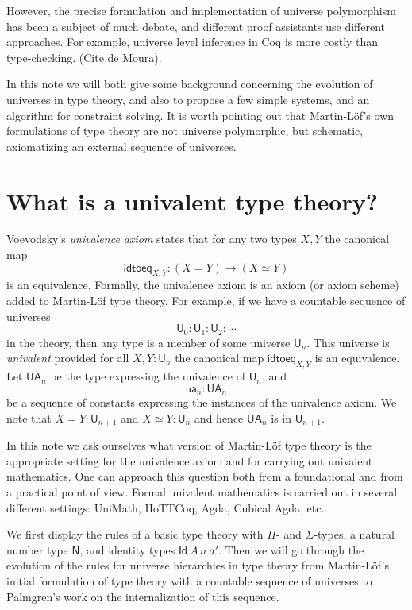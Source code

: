 \documentclass[10pt,a4paper]{article}
\newcommand{\Id}{\mathsf{Id}}
\def\NN{\mathsf{N}}
\def\UU{\mathsf{U}}
\newcommand{\idtoeq}{\mathsf{idtoeq}}
\newcommand{\ua}{\mathsf{ua}}
\newcommand{\UA}{\mathsf{UA}}
\begin{document}
However, the precise formulation and implementation of universe polymorphism has been a subject of much debate, and different proof assistants use different approaches. For example, universe level inference in Coq is more costly than type-checking. (Cite de Moura).

In this note we will both give some background concerning the evolution of universes in type theory, and also to propose a few simple systems, and an algorithm for constraint solving. It is worth pointing out that Martin-Löf's own formulations of type theory are not universe polymorphic, but schematic, axiomatizing an external sequence of universes.

\section{What is a univalent type theory?}

Voevodsky's {\em univalence axiom} states that for any two types $X,Y$ the canonical map 
$$
\idtoeq_{X,Y} : (X=Y)\to (X\simeq Y)
$$
is an equivalence. Formally, the univalence axiom is an axiom (or axiom scheme) added to Martin-Löf type theory. For example, if we have a countable sequence of universes
$$
\UU_0 : \UU_1 : \UU_2 : \cdots
$$
in the theory, then any type is a member of some universe $\UU_n$. This universe is {\em univalent} provided for all $X,Y : \UU_n$ the canonical map $\idtoeq_{X,Y}$ is an equivalence. Let $\UA_n$ be the type expressing the univalence of $\UU_n$, and $$\ua_n : \UA_n$$ be a sequence of constants expressing the instances of the univalence axiom. We note that $X = Y : \UU_{n+1}$ and $X\simeq Y : \UU_n$ and hence $\UA_n$ is in $\UU_{n+1}$. 

In this note we ask ourselves what version of Martin-Löf type theory is the appropriate setting for the univalence axiom and for carrying out univalent mathematics. One can approach this question both from a foundational and from a practical point of view. Formal univalent mathematics is carried out in several different settings: UniMath, HoTTCoq, Agda, Cubical Agda, etc.

We first display the rules of a basic type theory with $\Pi$- and $\Sigma$-types, a natural number type $\NN$, and identity types $\Id~A~a~a'$. Then we will go through the evolution of the rules for universe hierarchies in type theory from Martin-Löf's initial formulation of type theory with a countable sequence of universes \cite{martinlof:predicative} to Palmgren's work on the internalization of this sequence.
\end{document}
